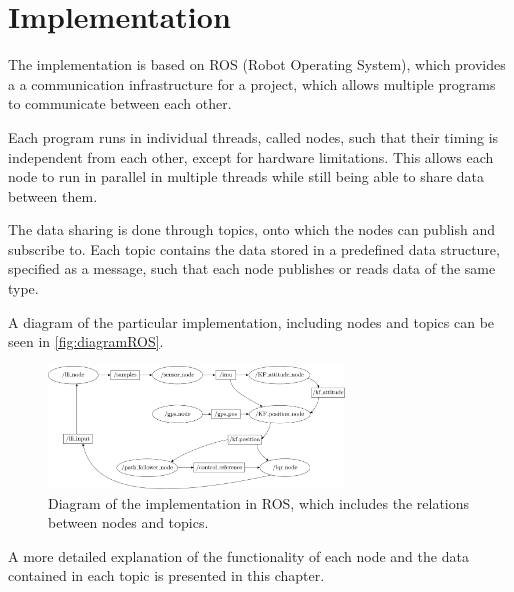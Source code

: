 \chapter{Implementation}
The implementation is based on ROS (Robot Operating System), which provides a a communication infrastructure for a project, which allows multiple programs to communicate between each other. 

Each program runs in individual threads, called nodes, such that their timing is independent from each other, except for hardware limitations. This allows each node to run in parallel in multiple threads while still being able to share data between them.

The data sharing is done through topics, onto which the nodes can publish and subscribe to. Each topic contains the data stored in a predefined data structure, specified as a message, such that each node publishes or reads data of the same type.

A diagram of the particular implementation, including nodes and topics can be seen in \autoref{fig:diagramROS}.

\begin{figure}[H]
    \includegraphics[width=0.7\textwidth]{figures/diagramROS}
    \caption{Diagram of the implementation in ROS, which includes the relations between nodes and topics.}
    \label{fig:diagramROS}
\end{figure}

A more detailed explanation of the functionality of each node and the data contained in each topic is presented in this chapter.




